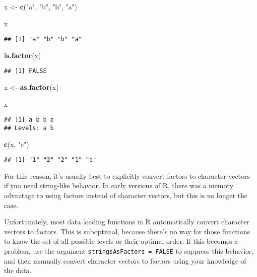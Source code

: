 \documentclass[
]{book}
\newenvironment{Shaded}{\begin{snugshade}}{\end{snugshade}}
\newcommand{\KeywordTok}[1]{\textcolor[rgb]{0.13,0.29,0.53}{\textbf{#1}}}
\newcommand{\NormalTok}[1]{#1}
\newcommand{\StringTok}[1]{\textcolor[rgb]{0.31,0.60,0.02}{#1}}
\begin{document}
\begin{Shaded}
\begin{Highlighting}[]
\NormalTok{x \textless{}{-}}\StringTok{ }\KeywordTok{c}\NormalTok{(}\StringTok{"a"}\NormalTok{, }\StringTok{"b"}\NormalTok{, }\StringTok{"b"}\NormalTok{, }\StringTok{"a"}\NormalTok{)}

\NormalTok{x}
\end{Highlighting}
\end{Shaded}

\begin{verbatim}
## [1] "a" "b" "b" "a"
\end{verbatim}

\begin{Shaded}
\begin{Highlighting}[]
\KeywordTok{is.factor}\NormalTok{(x)}
\end{Highlighting}
\end{Shaded}

\begin{verbatim}
## [1] FALSE
\end{verbatim}

\begin{Shaded}
\begin{Highlighting}[]
\NormalTok{x \textless{}{-}}\StringTok{ }\KeywordTok{as.factor}\NormalTok{(x)}

\NormalTok{x}
\end{Highlighting}
\end{Shaded}

\begin{verbatim}
## [1] a b b a
## Levels: a b
\end{verbatim}

\begin{Shaded}
\begin{Highlighting}[]
\KeywordTok{c}\NormalTok{(x, }\StringTok{"c"}\NormalTok{)}
\end{Highlighting}
\end{Shaded}

\begin{verbatim}
## [1] "1" "2" "2" "1" "c"
\end{verbatim}

For this reason, it's usually best to explicitly convert factors to character vectors if you need string-like behavior. In early versions of R, there was a memory advantage to using factors instead of character vectors, but this is no longer the case.

Unfortunately, most data loading functions in R automatically convert character vectors to factors. This is suboptimal, because there's no way for those functions to know the set of all possible levels or their optimal order. If this becomes a problem, use the argument \texttt{stringsAsFactors\ =\ FALSE} to suppress this behavior, and then manually convert character vectors to factors using your knowledge of the data.
\end{document}
